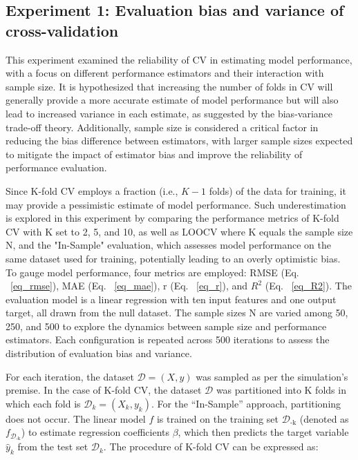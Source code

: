 \subsection{Experiment 1: Evaluation bias and variance of cross-validation}

This experiment examined the reliability of CV in estimating model performance, with a focus on different performance estimators and their interaction with sample size. It is hypothesized that increasing the number of folds in CV will generally provide a more accurate estimate of model performance but will also lead to increased variance in each estimate, as suggested by the bias-variance trade-off theory. Additionally, sample size is considered a critical factor in reducing the bias difference between estimators, with larger sample sizes expected to mitigate the impact of estimator bias and improve the reliability of performance evaluation.

Since K-fold CV employs a fraction (i.e., $K-1$ folds) of the data for training, it may provide a pessimistic estimate of model performance. 
Such underestimation is explored in this experiment by comparing the performance metrics of K-fold CV with K set to 2, 5, and 10, as well as LOOCV where K equals the sample size N, and the "In-Sample" evaluation, which assesses model performance on the same dataset used for training, potentially leading to an overly optimistic bias. To gauge model performance, four metrics are employed: RMSE (Eq. ~\ref{eq_rmse}), MAE (Eq. ~\ref{eq_mae}), r (Eq. ~\ref{eq_r}), and $R^2$ (Eq. ~\ref{eq_R2}). The evaluation model is a linear regression with ten input features and one output target, all drawn from the null dataset. The sample sizes N are varied among 50, 250, and 500 to explore the dynamics between sample size and performance estimators. Each configuration is repeated across 500 iterations to assess the distribution of evaluation bias and variance.

For each iteration, the dataset $\mathcal{D}={(X, y)}$ was sampled as per the simulation’s premise. In the case of K-fold CV, the dataset $\mathcal{D}$ was partitioned into K folds in which each fold is $\mathcal{D}_k={(X_k, y_k)}$. For the “In-Sample” approach, partitioning does not occur. The linear model $f$ is trained on the training set $\mathcal{D}_\text{-k}$ (denoted as $f_{\mathcal{D}_{\text{-k}}}$) to estimate regression coefficients $\beta$, which then predicts the target variable ${\hat{y}}_k$ from the test set $\mathcal{D}_k$. The procedure of K-fold CV can be expressed as:

